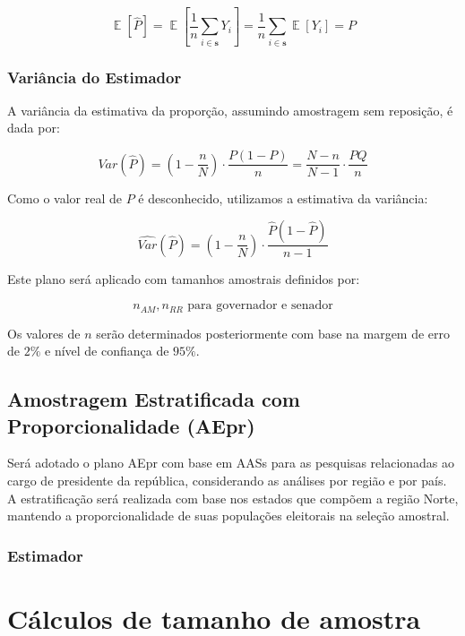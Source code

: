 \documentclass{article}
\DeclareMathOperator{\E}{\mathbb{E}}
\begin{document}
\[
\E[\hat{P}] = \E\left[\frac{1}{n}\sum_{i \in \mathbf{s}} Y_i\right] = \frac{1}{n} \sum_{i \in \mathbf{s}} \E[Y_i] = P
\]

\subsubsection*{Variância do Estimador}

A variância da estimativa da proporção, assumindo amostragem sem reposição, é dada por:

\[
Var(\hat{P}) = \left(1 - \frac{n}{N}\right) \cdot \frac{P(1 - P)}{n} = \frac{N - n}{N - 1} \cdot \frac{PQ}{n}
\]

Como o valor real de $P$ é desconhecido, utilizamos a estimativa da variância:

\[
\widehat{Var}(\hat{P}) = \left(1 - \frac{n}{N} \right) \cdot \frac{\hat{P}(1 - \hat{P})}{n - 1}
\]

Este plano será aplicado com tamanhos amostrais definidos por:

\[
n_{AM}, n_{RR} \text{ para governador e senador}
\]

Os valores de $n$ serão determinados posteriormente com base na margem de erro de $2\%$ e nível de confiança de $95\%$.

\subsection*{Amostragem Estratificada com Proporcionalidade (AEpr)}

Será adotado o plano AEpr com base em AASs para as pesquisas relacionadas ao cargo de presidente da república, considerando as análises por região e por país. A estratificação será realizada com base nos estados que compõem a região Norte, mantendo a proporcionalidade de suas populações eleitorais na seleção amostral.

\subsubsection*{Estimador }

\section{Cálculos de tamanho de amostra}
\end{document}
